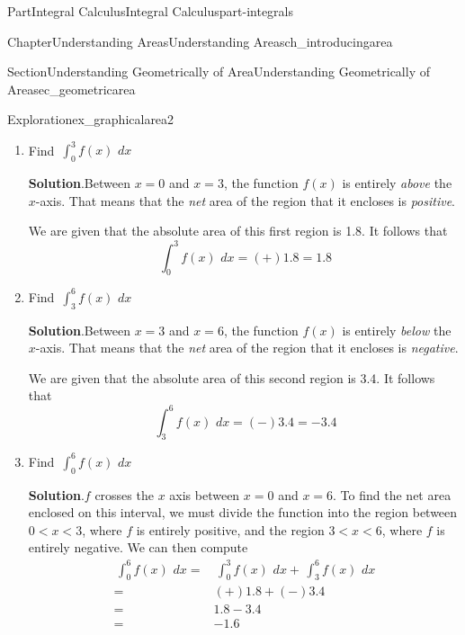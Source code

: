 \documentclass{tufte-book}
\newcommand{\blocktitlefont}{\relax}
\numberwithin{equation}{chapter}
\newcommand{\intdx}[1]{{\,\int#1\,\,dx}}
\newcommand{\lt}{<}
\newcommand{\amp}{&}
\begin{document}
\begin{partptx}{Part}{Integral Calculus}{}{Integral Calculus}{}{}{part-integrals}
\begin{chapterptx}{Chapter}{Understanding Areas}{}{Understanding Areas}{}{}{ch_introducingarea}
\begin{sectionptx}{Section}{Understanding Geometrically of Area}{}{Understanding Geometrically of Area}{}{}{sec_geometricarea}
\begin{exploration}{Exploration}{}{ex_graphicalarea2}
\begin{image}{0.25}{0.5}{0.25}{}
{
}%
\end{image}%
\begin{enumerate}[font=\bfseries,label=(\alph*),ref=\alph*]%
\item{}Find \(\displaystyle\intdx{_0^3 f(x) }\)%
\par\smallskip%
\noindent\textbf{\blocktitlefont Solution}.\hypertarget{ex_graphicalarea2-2-2}{}\quad{}Between \(x=0\) and \(x=3\), the function \(f(x)\) is entirely \emph{above} the \(x\)-axis. That means that the \emph{net} area of the region that it encloses is \emph{positive}.%
\par
We are given that the absolute area of this first region is 1.8.  It follows that%
\begin{equation*}
\intdx{_0^3 f(x) } = (+) 1.8 = 1.8
\end{equation*}
%
\item{}Find \(\displaystyle\intdx{_3^6 f(x) }\)%
\par\smallskip%
\noindent\textbf{\blocktitlefont Solution}.\hypertarget{ex_graphicalarea2-3-2}{}\quad{}Between \(x=3\) and \(x=6\), the function \(f(x)\) is entirely \emph{below} the \(x\)-axis. That means that the \emph{net} area of the region that it encloses is \emph{negative}.%
\par
We are given that the absolute area of this second region is 3.4.  It follows that%
\begin{equation*}
\intdx{_3^6 f(x) } = (-) 3.4 = -3.4
\end{equation*}
%
\item{}Find \(\displaystyle\intdx{_0^6 f(x) }\)%
\par\smallskip%
\noindent\textbf{\blocktitlefont Solution}.\hypertarget{ex_graphicalarea2-4-2}{}\quad{}\(f\) crosses the \(x\) axis between \(x=0\) and \(x=6\). To find the net area enclosed on this interval, we must divide the function into the region between \(0\lt x \lt 3\), where \(f\) is entirely positive, and the region \(3\lt x\lt 6\), where \(f\) is entirely negative. We can then compute%
\begin{align*}
\intdx{_0^6 f(x)} = \amp \intdx{_0^3 f(x)} + \intdx{_3^6 f(x) } \\
= \amp (+)1.8 + (-)3.4\\
= \amp 1.8 - 3.4 \\
= \amp -1.6
\end{align*}

\end{enumerate}
\end{exploration}
\end{sectionptx}
\end{chapterptx}
\end{partptx}
\end{document}
